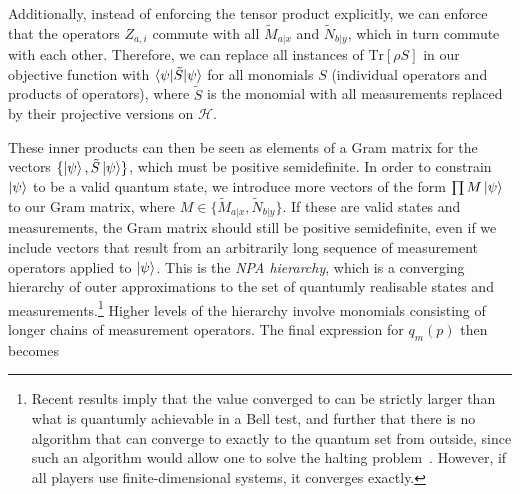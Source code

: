 \documentclass[10pt, a4paper]{article}
\numberwithin{equation}{section} %
\theoremstyle{definition}
\theoremstyle{plain}
\newcommand{\?}{\mathrel{?}} %
\newcommand{\Tr}{\mathrm{Tr}} %
\newcommand{\Hs}{\mathcal{H}} %
\begin{document}
      Additionally, instead of enforcing the tensor product explicitly, we can enforce that the operators \(Z_{a,i}\) commute with all \(\tilde{M}_{a|x}\) and \(\tilde{N}_{b|y}\), which in turn commute with each other. Therefore, we can replace all instances of \(\Tr\left[\rho S\right]\) in our objective function with \(\braket{\psi|\tilde{S}|\psi}\) for all monomials \(S\) (individual operators and products of operators), where \(\tilde{S}\) is the monomial with all measurements replaced by their projective versions on \(\Hs\). 

      These inner products can then be seen as elements of a Gram matrix for the vectors \(\{\ket{\psi}, \tilde{S}\ket{\psi}\}\), which must be positive semidefinite. In order to constrain \(\ket{\psi}\) to be a valid quantum state, we introduce more vectors of the form \(\prod M\ket{\psi}\) to our Gram matrix, where \(M \in \{\tilde{M}_{a|x}, \tilde{N}_{b|y}\}\). If these are valid states and measurements, the Gram matrix should still be positive semidefinite, even if we include vectors that result from an arbitrarily long sequence of measurement operators applied to \(\ket{\psi}\). This is the \emph{NPA hierarchy}, which is a converging hierarchy of outer approximations to the set of quantumly realisable states and measurements.\footnote{Recent results imply that the value converged to can be strictly larger than what is quantumly achievable in a Bell test, and further that there is no algorithm that can converge to exactly to the quantum set from outside, since such an algorithm would allow one to solve the halting problem~\cite{MIPRE}. However, if all players use finite-dimensional systems, it converges exactly.} Higher levels of the hierarchy involve monomials consisting of longer chains of measurement operators. The final expression for \(q_m(p)\) then becomes
\end{document}
